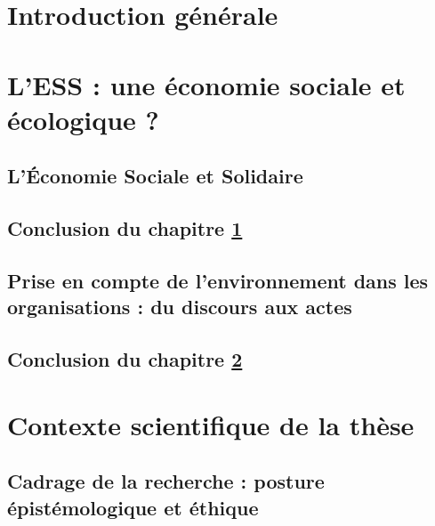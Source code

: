 \documentclass{Classe_Seba}
\begin{document}
    \mainmatter
    		\part*{Introduction générale}
        		

        \whitepage
        \part{L'ESS : une économie sociale et écologique ?}
            \label{partie:1}

            \chapter{L'Économie Sociale et Solidaire}
                \label{chapitre:ess}
                \minitoc \newpage
                
            \chapter*{Conclusion du chapitre \ref{chapitre:ess}}
                

            \chapter{Prise en compte de l'environnement dans les organisations : du discours aux actes}
                \label{chapitre:ei}
                \minitoc \newpage
                
            \chapter*{Conclusion du chapitre \ref{chapitre:ei}}
                

        \whitepage
    	\part{Contexte scientifique de la thèse}
    	    \label{partie:methodo}

            \chapter{Cadrage de la recherche : posture épistémologique et éthique}
                \label{chapitre:demarche}
                \minitoc \newpage
                
                
\end{document}
